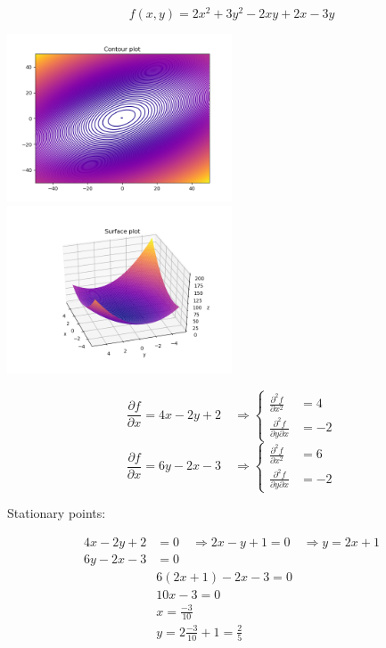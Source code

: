 \documentclass[12pt]{article}         %
\begin{document}
\begin{equation}
	f(x,y) = 2x^2 +3y^2 - 2xy + 2x - 3y
\end{equation}

\includegraphics[width=0.5\textwidth]{Figure_3}
\includegraphics[width=0.5\textwidth]{Surface_3}

$$
\frac {\partial f}{\partial x} = 4x-2y+2 \quad\Rightarrow 
	\left\{
	\begin{aligned}
		\frac {\partial^2 f}{\partial x^2}&=4\\
		\frac {\partial^2 f}{\partial y \partial x}&=-2
	 \end{aligned} 
	 \right.
$$
$$
\frac {\partial f}{\partial x} = 6y-2x-3 \quad\Rightarrow 
	\left\{
	\begin{aligned}
		\frac {\partial^2 f}{\partial x^2}&=6\\
		\frac {\partial^2 f}{\partial y \partial x}&=-2
	 \end{aligned} 
	 \right.
$$

Stationary points:

$$
\begin{aligned}
4x-2y+2&=0 \quad\Rightarrow 2x-y+1=0 \quad\Rightarrow y=2x+1\\
6y-2x-3&=0\\
&6(2x+1) -2x-3=0\\
&10x-3=0\\
&x=\frac{-3}{10}\\
&y=2\frac{-3}{10} +1 = \frac{2}{5}
\end{aligned}
$$
\end{document}
